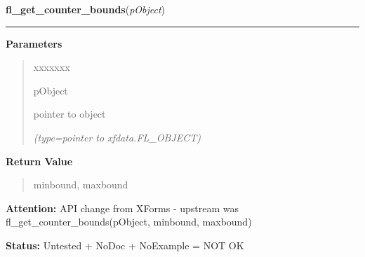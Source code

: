 \hspace{.8\funcindent}\begin{boxedminipage}{\funcwidth}

    \raggedright \textbf{fl\_get\_counter\_bounds}(\textit{pObject})

    \vspace{-1.5ex}

    \rule{\textwidth}{0.5\fboxrule}
\setlength{\parskip}{2ex}
\setlength{\parskip}{1ex}
      \textbf{Parameters}
      \vspace{-1ex}

      \begin{quote}
        \begin{Ventry}{xxxxxxx}

          \item[pObject]

          pointer to object

            {\it (type=pointer to xfdata.FL\_OBJECT)}

        \end{Ventry}

      \end{quote}

      \textbf{Return Value}
    \vspace{-1ex}

      \begin{quote}
      minbound, maxbound

      \end{quote}

\textbf{Attention:} API change from XForms - upstream was fl\_get\_counter\_bounds(pObject, 
minbound, maxbound)



\textbf{Status:} Untested + NoDoc + NoExample = NOT OK



    \end{boxedminipage}

    \label{xformslib:library:fl_get_counter_step}

    \vspace{0.5ex}

